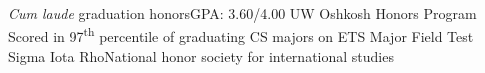 \cvitemwithcomment{}
    {\listitemsymbol\textit{Cum laude} graduation honors}{GPA: 3.60/4.00}
\cvitem{}
    {\listitemsymbol UW Oshkosh Honors Program}
\cvitem{}
    {\listitemsymbol Scored in 97\textsuperscript{th} percentile of graduating CS majors on ETS
    Major Field Test}
\cvitemwithcomment{}
    {\listitemsymbol Sigma Iota Rho}{National honor society for international studies}